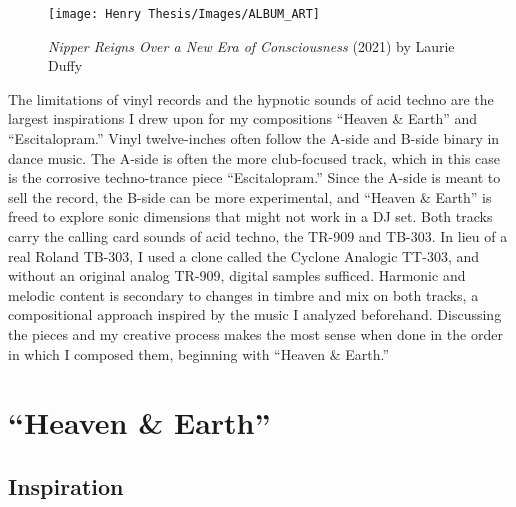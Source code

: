 \documentclass[12pt,twoside]{reedthesis}
\begin{document}
\begin{figure}
\begin{centering} 
\texttt{[image: Henry Thesis/Images/ALBUM\_ART]}
\caption{\emph{Nipper Reigns Over a New Era of Consciousness} (2021) by Laurie Duffy}
\label{fig:albumart}
\end{centering} 
\end{figure}

The limitations of vinyl records and the hypnotic sounds of acid techno are the largest inspirations I drew upon for my compositions ``Heaven {\&} Earth'' and ``Escitalopram.'' Vinyl twelve-inches often follow the A-side and B-side binary in dance music. The A-side is often the more club-focused track, which in this case is the corrosive techno-trance piece ``Escitalopram.'' Since the A-side is meant to sell the record, the B-side can be more experimental, and ``Heaven {\&} Earth'' is freed to explore sonic dimensions that might not work in a DJ set. Both tracks carry the calling card sounds of acid techno, the TR-909 and TB-303. In lieu of a real Roland TB-303, I used a clone called the Cyclone Analogic TT-303, and without an original analog TR-909, digital samples sufficed. Harmonic and melodic content is secondary to changes in timbre and mix on both tracks, a compositional approach inspired by the music I analyzed beforehand. Discussing the pieces and my creative process makes the most sense when done in the order in which I composed them, beginning with ``Heaven {\&} Earth.''

\section{``Heaven {\&} Earth''}

\subsection{Inspiration}
\end{document}
